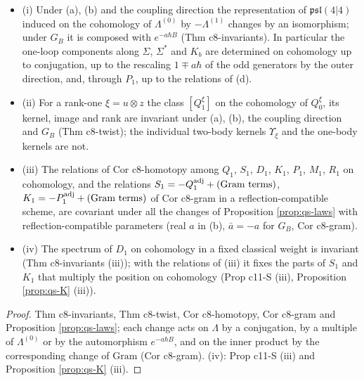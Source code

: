 \begin{theorem}
\label{thm:qs-invariant}
\begin{itemize}
\item (i) Under (a), (b) and the coupling direction the representation of $\mathfrak{psl}(4|4)$ induced on the cohomology of $\Lambda^{(0)}$ by $-\Lambda^{(1)}$ changes by an isomorphism; under $G_B$ it is composed with $e^{-a\hbar B}$ (Thm c8-invariants). In particular the one-loop components along $\Sigma$, $\Sigma^*$ and $K_b$ are determined on cohomology up to conjugation, up to the rescaling $1\mp a\hbar$ of the odd generators by the outer direction, and, through $P_1$, up to the relations of (d).
\item (ii) For a rank-one $\xi=u\otimes z$ the class $[Q^\xi_1]$ on the cohomology of $Q^\xi_0$, its kernel, image and rank are invariant under (a), (b), the coupling direction and $G_B$ (Thm c8-twist); the individual two-body kernels $\Upsilon_\xi$ and the one-body kernels are not.
\item (iii) The relations of Cor c8-homotopy among $Q_1$, $S_1$, $D_1$, $K_1$, $P_1$, $M_1$, $R_1$ on cohomology, and the relations $S_1=-Q_1^{\rm adj}+(\text{Gram terms})$, $K_1=-P_1^{\rm adj}+(\text{Gram terms})$ of Cor c8-gram in a reflection-compatible scheme, are covariant under all the changes of Proposition \ref{prop:qs-laws} with reflection-compatible parameters (real $a$ in (b), $\bar a=-a$ for $G_B$, Cor c8-gram).
\item (iv) The spectrum of $D_1$ on cohomology in a fixed classical weight is invariant (Thm c8-invariants (iii)); with the relations of (iii) it fixes the parts of $S_1$ and $K_1$ that multiply the position on cohomology (Prop c11-S (iii), Proposition \ref{prop:qs-K} (iii)).
\end{itemize}
\end{theorem}

\begin{proof}
Thm c8-invariants, Thm c8-twist, Cor c8-homotopy, Cor c8-gram and Proposition \ref{prop:qs-laws}; each change acts on $\Lambda$ by a conjugation, by a multiple of $\Lambda^{(0)}$ or by the automorphism $e^{-a\hbar B}$, and on the inner product by the corresponding change of $\mathrm{Gram}$ (Cor c8-gram). (iv): Prop c11-S (iii) and Proposition \ref{prop:qs-K} (iii).
\end{proof}
